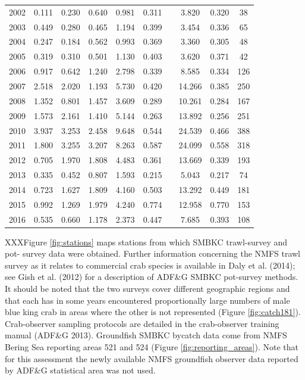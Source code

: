 \documentclass[]{article}
\begin{document}
\begin{table}[ht]
\begin{tabular}{lccccccccc}
  2002 & 0.111 & 0.230 & 0.640 & 0.981 & 0.311 & & 3.820 & 0.320 & 38 \\
  2003 & 0.449 & 0.280 & 0.465 & 1.194 & 0.399 & & 3.454 & 0.336 & 65 \\
  2004 & 0.247 & 0.184 & 0.562 & 0.993 & 0.369 & & 3.360 & 0.305 & 48 \\
  2005 & 0.319 & 0.310 & 0.501 & 1.130 & 0.403 & & 3.620 & 0.371 & 42 \\
  2006 & 0.917 & 0.642 & 1.240 & 2.798 & 0.339 & & 8.585 & 0.334 & 126 \\
  2007 & 2.518 & 2.020 & 1.193 & 5.730 & 0.420 & & 14.266 & 0.385 & 250 \\
  2008 & 1.352 & 0.801 & 1.457 & 3.609 & 0.289 & & 10.261 & 0.284 & 167 \\
  2009 & 1.573 & 2.161 & 1.410 & 5.144 & 0.263 & & 13.892 & 0.256 & 251 \\
  2010 & 3.937 & 3.253 & 2.458 & 9.648 & 0.544 & & 24.539 & 0.466 & 388 \\
  2011 & 1.800 & 3.255 & 3.207 & 8.263 & 0.587 & & 24.099 & 0.558 & 318 \\
  2012 & 0.705 & 1.970 & 1.808 & 4.483 & 0.361 & & 13.669 & 0.339 & 193 \\
  2013 & 0.335 & 0.452 & 0.807 & 1.593 & 0.215 & & 5.043 & 0.217 & 74 \\
  2014 & 0.723 & 1.627 & 1.809 & 4.160 & 0.503 & & 13.292 & 0.449 & 181 \\
  2015 & 0.992 & 1.269 & 1.979 & 4.240 & 0.774 & & 12.958 & 0.770 & 153 \\
  2016 & 0.535 & 0.660 & 1.178 & 2.373 & 0.447 & & 7.685 & 0.393 & 108 \\
  \hline
\end{tabular}
\end{table}

XXXFigure \ref{fig:stations} maps stations from which SMBKC trawl-survey
and pot- survey data were obtained. Further information concerning the
NMFS trawl survey as it relates to commercial crab species is available
in Daly et al. (2014); see Gish et al. (2012) for a description of
ADF\&G SMBKC pot-survey methods. It should be noted that the two surveys
cover different geographic regions and that each has in some years
encountered proportionally large numbers of male blue king crab in areas
where the other is not represented (Figure \ref{fig:catch181}).
Crab-observer sampling protocols are detailed in the crab-observer
training manual (ADF\&G 2013). Groundfish SMBKC bycatch data come from
NMFS Bering Sea reporting areas 521 and 524 (Figure
\ref{fig:reporting_areas}). Note that for this assessment the newly
available NMFS groundfish observer data reported by ADF\&G statistical
area was not used.
\end{document}
